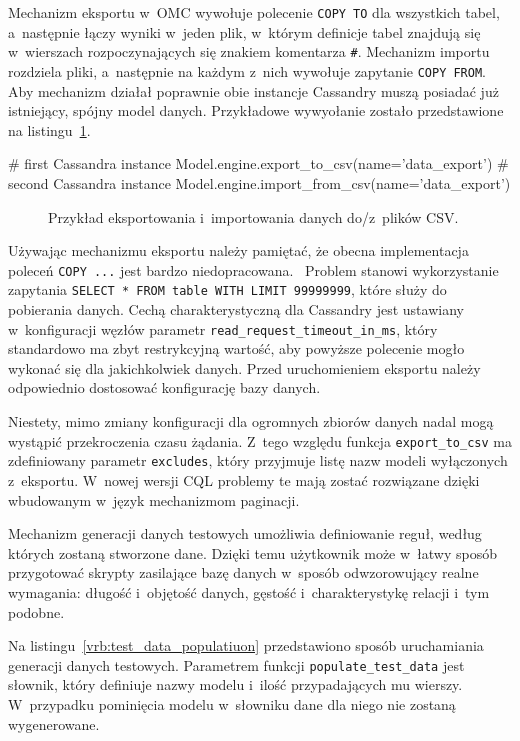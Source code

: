 Mechanizm eksportu w~OMC wywołuje polecenie \verb+COPY TO+ dla wszystkich tabel, a~następnie łączy wyniki w~jeden plik, w~którym definicje tabel znajdują się w~wierszach rozpoczynających się znakiem komentarza \verb+#+. Mechanizm importu rozdziela pliki, a~następnie na każdym z~nich wywołuje zapytanie \verb+COPY FROM+. Aby mechanizm działał poprawnie obie instancje Cassandry muszą posiadać już istniejący, spójny model danych. Przykładowe wywyołanie zostało przedstawione na listingu~\ref{vrb:export_import_example}.

\begin{verbbox}
	# first Cassandra instance
	Model.engine.export_to_csv(name='data_export')
	# second Cassandra instance
	Model.engine.import_from_csv(name='data_export')
\end{verbbox}

\begin{figure}[ht!]
	\centering
	\theverbbox
	\caption{Przykład eksportowania i~importowania danych do/z~plików CSV.}
	\label{vrb:export_import_example}
\end{figure}

Używając mechanizmu eksportu należy pamiętać, że obecna implementacja poleceń \verb+COPY ...+ jest bardzo niedopracowana.~\cite{simple_data_importing_and_exporting} Problem stanowi wykorzystanie zapytania \verb+SELECT * FROM table WITH LIMIT 99999999+, które służy do pobierania danych. Cechą charakterystyczną dla Cassandry jest ustawiany w~konfiguracji węzłów parametr \verb+read_request_timeout_in_ms+, który standardowo ma zbyt restrykcyjną wartość, aby powyższe polecenie mogło wykonać się dla jakichkolwiek danych. Przed uruchomieniem eksportu należy odpowiednio dostosować konfigurację bazy danych.

Niestety, mimo zmiany konfiguracji dla ogromnych zbiorów danych nadal mogą wystąpić przekroczenia czasu żądania. Z~tego względu funkcja \verb+export_to_csv+ ma zdefiniowany parametr \verb+excludes+, który przyjmuje listę nazw modeli wyłączonych z~eksportu. W~nowej wersji CQL problemy te mają zostać rozwiązane dzięki wbudowanym w~język mechanizmom paginacji.

Mechanizm generacji danych testowych umożliwia definiowanie reguł, według których zostaną stworzone dane. Dzięki temu użytkownik może w~łatwy sposób przygotować skrypty zasilające bazę danych w~sposób odwzorowujący realne wymagania: długość i~objętość danych, gęstość i~charakterystykę relacji i~tym podobne. 

Na listingu~\ref{vrb:test_data_populatiuon} przedstawiono sposób uruchamiania generacji danych testowych. Parametrem funkcji \verb+populate_test_data+ jest słownik, który definiuje nazwy modelu i~ilość przypadających mu wierszy. W~przypadku pominięcia modelu w~słowniku dane dla niego nie zostaną wygenerowane.

